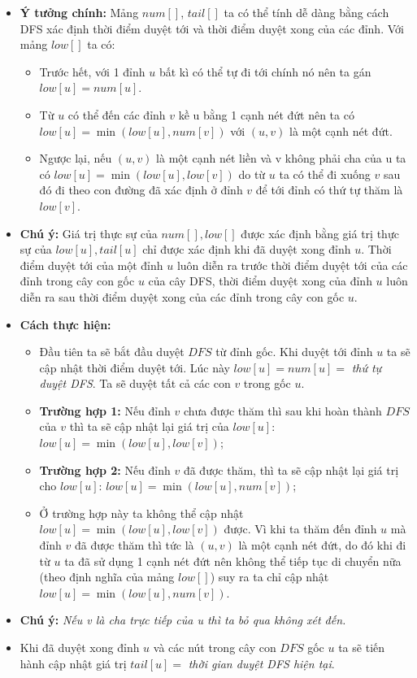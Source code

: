\documentclass{article}
\begin{document}
\begin{itemize}
    \item \textbf{Ý tưởng chính:} Mảng $num[]$, $tail[]$ ta có thể tính dễ dàng bằng cách DFS xác định thời điểm duyệt tới và thời điểm duyệt xong của các đỉnh. Với mảng $low[]$ ta có:
    \begin{itemize}
        \item Trước hết, với 1 đỉnh $u$ bất kì có thể tự đi tới chính nó nên ta gán $low[u] = num[u]$.
        \item Từ $u$ có thể đến các đỉnh $v$ kề u bằng 1 cạnh nét đứt nên ta có $low[u] = \min(low[u], num[v])$ với $(u, v)$ là một cạnh nét đứt.
        \item Ngược lại, nếu $(u, v)$ là một cạnh nét liền và v không phải cha của u ta có $low[u] = \min(low[u], low[v])$ do từ $u$ ta có thể đi xuống $v$ sau đó đi theo con đường đã xác định ở đỉnh $v$ để tới đỉnh có thứ tự thăm là $low[v]$.
    \end{itemize}
    \item \textbf{Chú ý:} Giá trị thực sự của $num[], low[]$ được xác định bằng giá trị thực sự của $low[u], tail[u]$ chỉ được xác định khi đã duyệt xong đỉnh $u$. Thời điểm duyệt tới của một đỉnh $u$ luôn diễn ra trước thời điểm duyệt tới của các đỉnh trong cây con gốc $u$ của cây DFS, thời điểm duyệt xong của đỉnh $u$ luôn diễn ra sau thời điểm duyệt xong của các đỉnh trong cây con gốc $u$.

    \item \textbf{Cách thực hiện:}
    \begin{itemize}
        \item Đầu tiên ta sẽ bắt đầu duyệt $DFS$ từ đỉnh gốc. Khi duyệt tới đỉnh $u$ ta sẽ cập nhật thời điểm duyệt tới. Lúc này $low[u] = num[u] =$ \textit{thứ tự duyệt DFS}. Ta sẽ duyệt tất cả các con $v$ trong gốc $u$.
        \item \textbf{Trường hợp 1:} Nếu đỉnh $v$ chưa được thăm thì sau khi hoàn thành $DFS$ của $v$ thì ta sẽ cập nhật lại giá trị của $low[u]$: $low[u] = \min(low[u], low[v])$;
        \item \textbf{Trường hợp 2:} Nếu đỉnh $v$ đã được thăm, thì ta sẽ cập nhật lại giá trị cho $low[u]$: $low[u] = \min(low[u], num[v])$;
        \item Ở trường hợp này ta không thể cập nhật $low[u] = \min(low[u], low[v])$ được. Vì khi ta thăm đến đỉnh $u$ mà đỉnh $v$ đã được thăm thì tức là $(u, v)$ là một cạnh nét đứt, do đó khi đi từ $u$ ta đã sử dụng 1 cạnh nét đứt nên không thể tiếp tục di chuyển nữa (theo định nghĩa của mảng $low[]$) suy ra ta chỉ cập nhật $low[u] = \min(low[u], num[v])$.
    \end{itemize}
    \item \textbf{Chú ý:} \textit{Nếu v là cha trực tiếp của u thì ta bỏ qua không xét đến.}
    \item Khi đã duyệt xong đỉnh $u$ và các nút trong cây con $DFS$ gốc $u$ ta sẽ tiến hành cập nhật giá trị $tail[u] =$ \textit{thời gian duyệt DFS hiện tại}.
\end{itemize}
\end{document}
